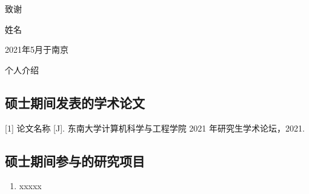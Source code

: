 \documentclass[engineering,oneside,openany]{seuthesis} %
\numberwithin{algorithm}{chapter}
\begin{document}
	\begin{Main} %
		
		

		
		
	\end{Main} %

	
%	
	
	
	
	\newpage
	\printindex %
		
	\begin{Acknowledgement}{}
		致谢
		
		\begin{flushright}
			姓名
			
			2021年5月于南京
		\end{flushright}
	\end{Acknowledgement}
	
	\begin{Resume}
		个人介绍
		
		\subsection*{硕士期间发表的学术论文}
			
			[1] 论文名称 [J]. 东南大学计算机科学与工程学院 2021 年研究生学术论坛，2021.
			
		
		\subsection*{硕士期间参与的研究项目}
		\begin{enumerate}
			\item xxxxx		
		\end{enumerate}
	\end{Resume}
	
	
	
\end{document}
